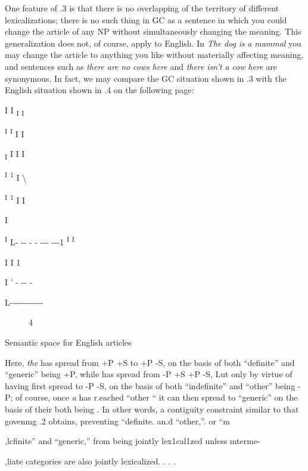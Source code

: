 One feature of .3 is that there is no overlapping of the territory of different lexicalizations; there is no such thing in GC as a sentence in which you could change the article of any NP without simultaneously changing the meaning. This generalization does not, of course, apply to English. In \textit{The} \textit{dog} \textit{is} \textit{a} \textit{mammal} you may change the article to anything you like without materially affecting meaning, and sentences such as \textit{there} \textit{are} \textit{no} \textit{cows} \textit{here} and \textit{there} \textit{isn't a} \textit{cow} \textit{here} are synonymous. In fact, we may compare the GC situation shown in .3 with the English situation shown in .4 on the following page:

I I \textsubscript{I }\textsubscript{I}

\textsuperscript{I }\textsuperscript{I }I I 

\textsubscript{I }I I I

\textsuperscript{I }\textsuperscript{1 }I {\textbackslash}

\textsuperscript{I }\textsuperscript{1 }I I 

I

\textsuperscript{I }L- {}-{}- {}- {}- {}-{}-{}- {}-{}-{}-1 \textsuperscript{I }\textsuperscript{I} 

I I 1 

I ' - {}-{}- - 

L-{}-{}-{}-{}-{}-{}-{}-{}-{}-{}-{}-

\begin{figure}
\caption{4}
\label{fig:4}
\end{figure}

Semantic space for English articles

Here, \textit{the} has spread from +P +S to +P -S, on the basis of both ``defi\-nite'' and ``generic'' being +P, while has spread from {}-P +S +P {}-S, Lut only by virtue of having first spread to {}-P {}-S, on the basis of both ``indefinite'' and ``other'' being {}-P; of course, once \textit{a} has r.eached ``other `` it can then spread to ``generic'' on the basis of their both being . In other words, a contiguity constraint similar to that goven\-mg .2 obtains, preventing ``definite{\textquotedbl}. an.d ``other,''. or ``m\-

,lcfinite'' and ``generic,'' from being jointly lex1cal1zed unless mterme-

,liate categories are also jointly lexicalized. . . .

